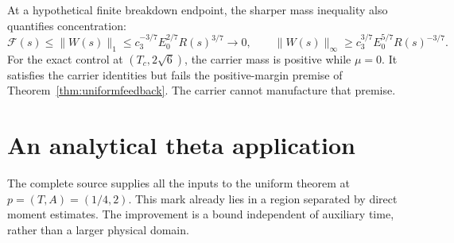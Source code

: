 \documentclass[11pt]{article}
\numberwithin{equation}{section}
\begin{document}
At a hypothetical finite breakdown endpoint, the sharper mass
inequality also quantifies concentration:
\begin{equation}\label{eq:carrierentropycollapse}
 \mathcal F(s)\le\|W(s)\|_1
 \le c_3^{-3/7}E_0^{2/7}R(s)^{3/7}\longrightarrow0,
 \qquad
 \|W(s)\|_\infty\ge c_3^{3/7}E_0^{5/7}R(s)^{-3/7}.
\end{equation}
For the exact control at $(T_c,2\sqrt6)$, the carrier mass is positive
while $\mu=0$. It satisfies the carrier identities but fails the
positive-margin premise of Theorem~\ref{thm:uniformfeedback}.
The carrier cannot manufacture that premise.


\section{An analytical theta application}\label{sec:thetapayment}

The complete source supplies all the inputs to the uniform theorem at
$p=(T,A)=(1/4,2)$. This mark already lies in a region separated by
direct moment estimates. The improvement is a bound independent of
auxiliary time, rather than a larger physical domain.
\end{document}
